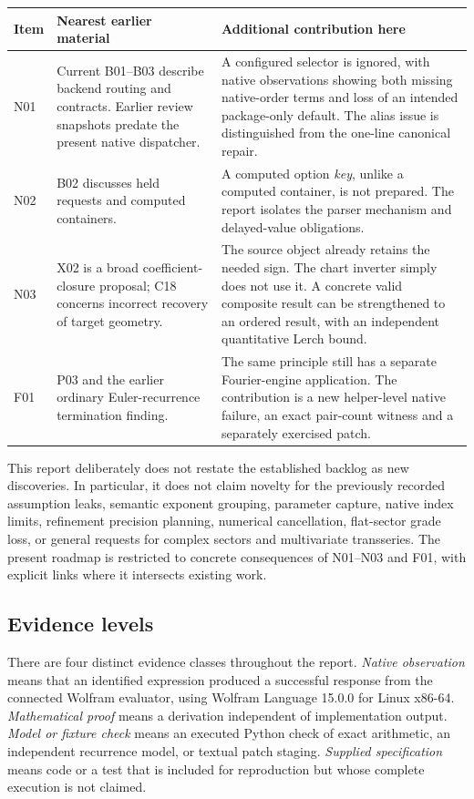 \documentclass[11pt,a4paper]{article}
\begin{document}
\begin{longtable}{L{14mm}L{44mm}L{88mm}}
\toprule
Item & Nearest earlier material & Additional contribution here\\\midrule\endhead
N01 & Current B01--B03 describe backend routing and contracts. Earlier review snapshots predate the present native dispatcher. & A configured selector is ignored, with native observations showing both missing native-order terms and loss of an intended package-only default. The alias issue is distinguished from the one-line canonical repair.\\
N02 & B02 discusses held requests and computed containers. & A computed option \emph{key}, unlike a computed container, is not prepared. The report isolates the parser mechanism and delayed-value obligations.\\
N03 & X02 is a broad coefficient-closure proposal; C18 concerns incorrect recovery of target geometry. & The source object already retains the needed sign. The chart inverter simply does not use it. A concrete valid composite result can be strengthened to an ordered result, with an independent quantitative Lerch bound.\\
F01 & P03 and the earlier ordinary Euler-recurrence termination finding. & The same principle still has a separate Fourier-engine application. The contribution is a new helper-level native failure, an exact pair-count witness and a separately exercised patch.\\
\bottomrule
\end{longtable}

This report deliberately does not restate the established backlog as new discoveries. In particular, it does not claim novelty for the previously recorded assumption leaks, semantic exponent grouping, parameter capture, native index limits, refinement precision planning, numerical cancellation, flat-sector grade loss, or general requests for complex sectors and multivariate transseries. The present roadmap is restricted to concrete consequences of N01--N03 and F01, with explicit links where it intersects existing work.

\subsection{Evidence levels}
There are four distinct evidence classes throughout the report. \emph{Native observation} means that an identified expression produced a successful response from the connected Wolfram evaluator, using Wolfram Language 15.0.0 for Linux x86-64. \emph{Mathematical proof} means a derivation independent of implementation output. \emph{Model or fixture check} means an executed Python check of exact arithmetic, an independent recurrence model, or textual patch staging. \emph{Supplied specification} means code or a test that is included for reproduction but whose complete execution is not claimed.
\end{document}
